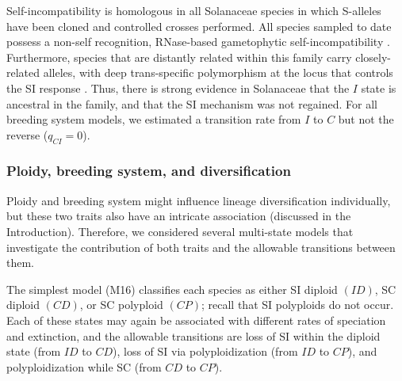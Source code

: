 Self-incompatibility is homologous in all Solanaceae species in which S-alleles have been cloned and controlled crosses performed.
All species sampled to date possess a non-self recognition, RNase-based gametophytic self-incompatibility \citep[shared even with other euasterid families;][]{ramanauskas_2017}.
Furthermore, species that are distantly related within this family carry closely-related alleles, with deep trans-specific polymorphism at the locus that controls the SI response \citep{ioerger_1990, igic_2006}.
Thus, there is strong evidence in Solanaceae that the $I$ state is ancestral in the family, and that the SI mechanism was not regained.
For all breeding system models, we estimated a transition rate from $I$ to $C$  but not the reverse ($q_{CI}=0$).
%

\subsubsection{Ploidy, breeding system, and diversification}

Ploidy and breeding system might influence lineage diversification individually, but these two traits also have an intricate association (discussed in the Introduction).
Therefore, we considered several multi-state models that investigate the contribution of both traits and the allowable transitions between them.

The simplest model (M16) classifies each species as either SI diploid $(ID)$, SC diploid $(CD)$, or SC polyploid $(CP)$; recall that SI polyploids do not occur.
Each of these states may again be associated with different rates of speciation and extinction, and the allowable transitions are loss of SI within the diploid state (from $ID$ to $CD$), loss of SI via polyploidization (from $ID$ to $CP$), and polyploidization while SC (from $CD$ to $CP$).


